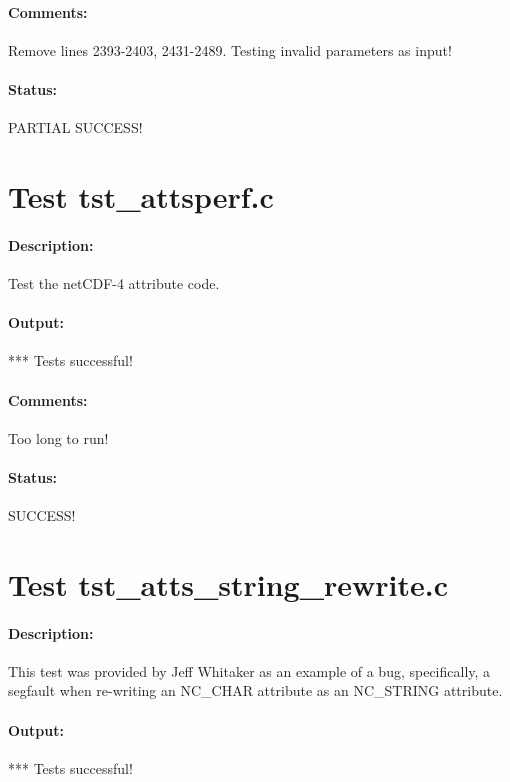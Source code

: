 \paragraph{Comments:} Remove lines 2393-2403, 2431-2489. Testing invalid parameters as input!

\paragraph{Status:} PARTIAL SUCCESS!

\section{Test tst\_attsperf.c}

\paragraph{Description:} Test the netCDF-4 attribute code.

\paragraph{Output:} *** Tests successful!

\paragraph{Comments:} Too long to run!

\paragraph{Status:} SUCCESS!

\section{Test tst\_atts\_string\_rewrite.c}

\paragraph{Description:} This test was provided by Jeff Whitaker as an example of a bug, specifically, a segfault when re-writing an NC\_CHAR attribute as an NC\_STRING attribute.

\paragraph{Output:} *** Tests successful!

